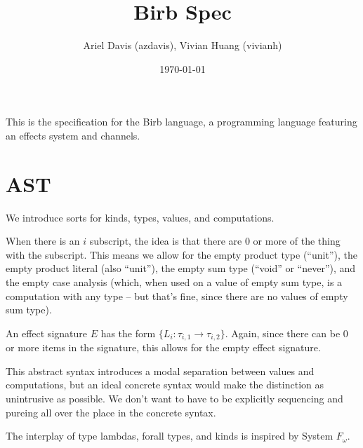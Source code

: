 \documentclass[12pt]{article}
\title{Birb Spec}
\author{Ariel Davis (azdavis), Vivian Huang (vivianh)}
\date{\today}
\begin{document}
\maketitle

This is the specification for the Birb language, a programming language
featuring an effects system and channels.

\newpage
\section{AST}

We introduce sorts for kinds, types, values, and computations.

When there is an $i$ subscript, the idea is that there are 0 or more of the
thing with the subscript. This means we allow for the empty product type
(``unit''), the empty product literal (also ``unit''), the empty sum type
(``void'' or ``never''), and the empty case analysis (which, when used on a
value of empty sum type, is a computation with any type -- but that's fine,
since there are no values of empty sum type).

An effect signature $E$ has the form $\{ L_i : \tau_{i,1} \rightarrow \tau_{i,2}
\}$. Again, since there can be 0 or more items in the signature, this allows for
the empty effect signature.

This abstract syntax introduces a modal separation between values and
computations, but an ideal concrete syntax would make the distinction as
unintrusive as possible. We don't want to have to be explicitly sequencing and
\textsf{pure}ing all over the place in the concrete syntax.

The interplay of type lambdas, forall types, and kinds is inspired by System
$F_\omega$.
\end{document}
